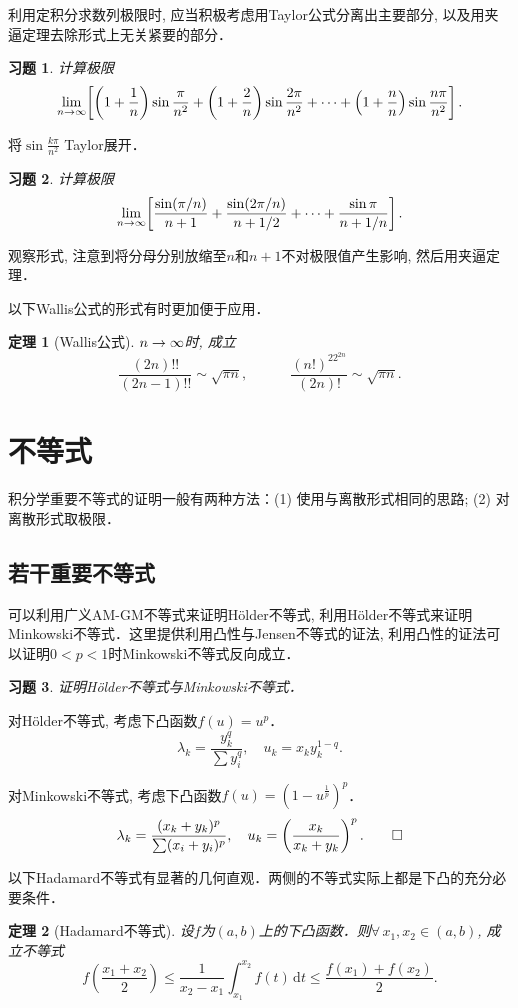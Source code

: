 \documentclass[11pt,a4paper]{ctexart}
\makeatletter
\theoremstyle{thmseries} %
\newtheorem{thm}{定理}[section]
\theoremstyle{exerseries}
\newtheorem{exer}{习题}[section]
\renewenvironment{proof}[1][\proofname]{\par
  \pushQED{\qed}%
  \normalfont \topsep6\p@\@plus6\p@\relax
  \trivlist
  \item[\hskip\labelsep
        \itshape
    #1\@addpunct{}]\ignorespaces
}{%
  \popQED\endtrivlist\@endpefalse
}
\newenvironment{sol}{\begin{proof}[\bfseries\upshape 解\quad]}{\end{proof}}
\newenvironment{pf}{\begin{proof}[\bfseries\upshape 证\quad]}{\end{proof}}
\newcommand{\bra}[1]{\mathopen{}\left(#1\right)}
\newcommand{\sbra}[1]{\mathopen{}\left[#1\right]}
\renewcommand{\d}{\mathrm{d}}
\def \nti {\mathnormal{n}\to\infty}
\makeatother
\begin{document}
利用定积分求数列极限时, 应当积极考虑用Taylor公式分离出主要部分, 以及用夹逼定理去除形式上无关紧要的部分．
\begin{exer}
	计算极限
	\[\lim_{\nti}\sbra{\bra{1+\frac{1}{n}}\sin\frac{\pi}{n^2}+\bra{1+\frac{2}{n}}\sin\frac{2\pi}{n^2}+\cdots+\bra{1+\frac{n}{n}}\sin\frac{n\pi}{n^2}}.\]
\end{exer}
\begin{sol}
	将$\sin\frac{k\pi}{n^2}$ Taylor展开．
\end{sol}

\begin{exer}
	计算极限
	\[\lim_{\nti}\sbra{\frac{\sin(\pi/n)}{n+1}+\frac{\sin(2\pi/n)}{n+1/2}+\cdots+\frac{\sin\pi}{n+1/n}}.\]
\end{exer}
\begin{sol}
	观察形式, 注意到将分母分别放缩至$n$和$n+1$不对极限值产生影响, 然后用夹逼定理．
\end{sol}

以下Wallis公式的形式有时更加便于应用．
\begin{thm}[Wallis公式]
	$\nti$时, 成立
	\[\frac{(2n)!!}{(2n-1)!!}\sim\sqrt{\pi n},\quad\qquad\frac{(n!)^22^{2n}}{(2n)!}\sim\sqrt{\pi n}.\]
\end{thm}


\section{不等式}
积分学重要不等式的证明一般有两种方法：(1) 使用与离散形式相同的思路; (2) 对离散形式取极限．
\subsection{若干重要不等式}
可以利用广义AM-GM不等式来证明H\"older不等式, 利用H\"older不等式来证明Minkowski不等式．这里提供利用凸性与Jensen不等式的证法, 利用凸性的证法可以证明$0<p<1$时Minkowski不等式反向成立．
\begin{exer}
	证明H\"older不等式与Minkowski不等式．
\end{exer}
\begin{pf}
	对H\"older不等式, 考虑下凸函数$f(u)=u^p$．
	\[\lambda_k=\frac{y_k^q}{\sum y_i^q},\quad u_k=x_ky_k^{1-q}.\]

	对Minkowski不等式, 考虑下凸函数$f(u)=\bra{1-u^{\frac{1}{p}}}^p$．
	\[\lambda_k=\frac{(x_k+y_k)^p}{\sum(x_i+y_i)^p},\quad u_k=\bra{\frac{x_k}{x_k+y_k}}^p.\qedhere\]
\end{pf}

以下Hadamard不等式有显著的几何直观．两侧的不等式实际上都是下凸的充分必要条件．
\begin{thm}[Hadamard不等式]
	设$f$为$(a,b)$上的下凸函数．则$\forall\,x_1,x_2\in(a,b)$, 成立不等式
	\[f\bra{\frac{x_1+x_2}{2}}\leq\frac{1}{x_2-x_1}\int_{x_1}^{x_2}f(t)\,\d t\leq\frac{f(x_1)+f(x_2)}{2}.\]
\end{thm}
\end{document}
